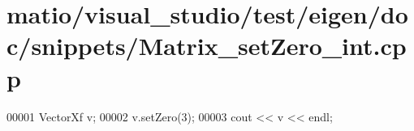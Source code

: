 \hypertarget{matio_2visual__studio_2test_2eigen_2doc_2snippets_2_matrix__set_zero__int_8cpp_source}{}\section{matio/visual\+\_\+studio/test/eigen/doc/snippets/\+Matrix\+\_\+set\+Zero\+\_\+int.cpp}
\label{matio_2visual__studio_2test_2eigen_2doc_2snippets_2_matrix__set_zero__int_8cpp_source}

\begin{DoxyCode}
00001 VectorXf v;
00002 v.setZero(3);
00003 cout << v << endl;
\end{DoxyCode}

